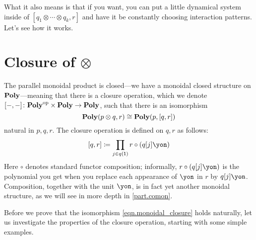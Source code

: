 \documentclass[Book-Poly]{subfiles}
\begin{document}
What it also means is that if you want, you can put a little dynamical system inside of $[q_1\otimes\cdots\otimes q_k,r]$ and have it be constantly choosing interaction patterns. Let's see how it works.


\section{Closure of $\otimes$}\label{sec.closure}%

The parallel monoidal product is closed---we have a monoidal closed structure on $\mathbf{Poly}$---meaning that there is a closure operation, which we denote $[-,-]\colon\mathbf{Poly}^{\textnormal{op}}\times\mathbf{Poly}\to\mathbf{Poly}$, such that there is an isomorphism
\begin{equation}\label{eqn.monoidal_closure}
  \mathbf{Poly}(p\otimes q,r) \cong \mathbf{Poly}(p,[q,r])
\end{equation}
natural in $p,q,r$.
The closure operation is defined on $q,r$ as follows:
\begin{equation}\label{eqn.par_hom}
	\ihom{q,r} \coloneqq \prod_{j\in q(\1)}r\circ(q[j]\yon)
\end{equation}
Here $\circ$ denotes standard functor composition; informally, $r \circ (q[j]\yon)$ is the polynomial you get when you replace each appearance of $\yon$ in $r$ by $q[j]\yon$.
Composition, together with the unit $\yon$, is in fact yet another monoidal structure, as we will see in more depth in \cref{part.comon}.

Before we prove that the isomorphism \eqref{eqn.monoidal_closure} holds naturally, let us investigate the properties of the closure operation, starting with some simple examples.
\end{document}
